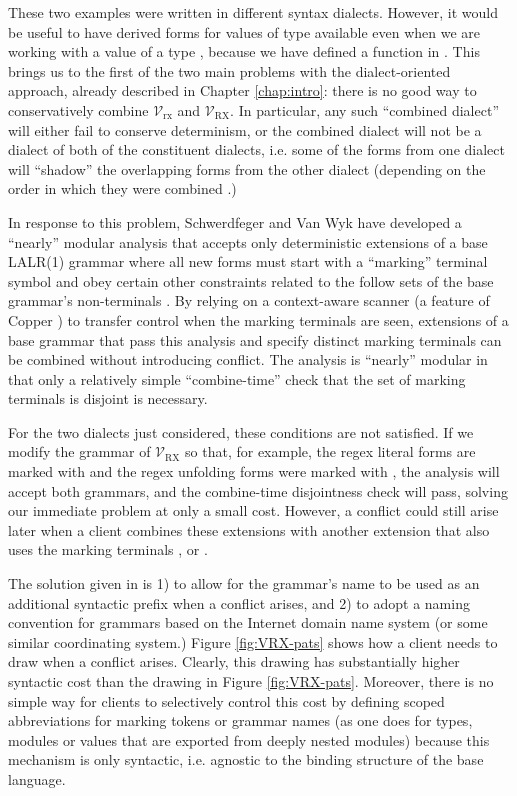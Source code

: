 {These two examples were written in different syntax dialects. However, it would be useful to have derived forms for values of type  available even when we are working with a value of a type , because we have defined a function  in . This brings us to the first of the two main problems with the dialect-oriented approach, already described in Chapter \ref{chap:intro}: there is no good way to conservatively combine $\mathcal{V}_\text{rx}$ and $\mathcal{V}_\text{RX}$. In particular, any such ``combined dialect'' will either fail to conserve determinism, or the combined dialect will not be a dialect of both of the constituent dialects, i.e. some of the forms from one dialect will ``shadow'' the overlapping forms from the other dialect (depending on the order in which they were combined \cite{Ford04a}.) 

In response to this problem, Schwerdfeger and Van Wyk have developed a ``nearly'' modular analysis that accepts only deterministic extensions of a base LALR(1) grammar where all new forms must start with a ``marking'' terminal symbol and obey certain other constraints related to  the follow sets of the base grammar's non-terminals \cite{conf/pldi/SchwerdfegerW09}. By relying on a context-aware scanner (a feature of Copper \cite{conf/gpce/WykS07}) to transfer control when the marking terminals are seen, extensions of a base grammar that pass this analysis and specify distinct marking terminals can be combined without introducing conflict. The analysis is ``nearly'' modular in that only a relatively simple ``combine-time'' check that the set of marking terminals is disjoint is necessary.

For the two dialects just considered, these conditions are not satisfied. If we modify the grammar of $\mathcal{V}_\text{RX}$ so that, for example, the regex literal forms are marked with  and the regex unfolding forms were marked with , the analysis will accept both grammars, and the combine-time disjointness check will pass, solving our immediate problem at only a small cost. However, a conflict could still  arise later when a client combines these extensions with another extension that also uses the marking terminals ,  or \li{/}. %

The solution given in \cite{conf/pldi/SchwerdfegerW09} is 1) to allow for the grammar's name to be used as an additional syntactic prefix when a conflict arises, and 2) to adopt a naming convention for grammars  based on the Internet domain name system (or some similar coordinating system.) Figure \ref{fig:VRX-pats} shows how a client needs to draw  when a conflict arises. Clearly, this drawing has substantially higher syntactic cost than the drawing in Figure \ref{fig:VRX-pats}. Moreover, there is no simple way for clients to selectively control this cost by defining scoped abbreviations for marking tokens or grammar names (as one does for types, modules or values that are exported from deeply nested modules) because this mechanism is only syntactic, i.e. agnostic to the binding structure of the base language.

}
